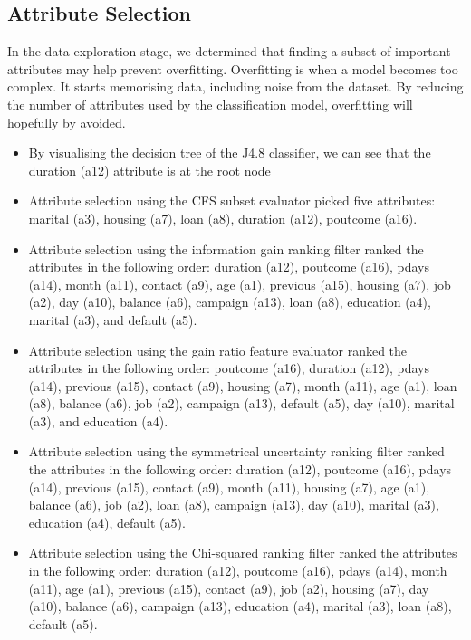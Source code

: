 \documentclass[a4paper,11pt]{article}
\begin{document}
\subsection{Attribute Selection}

In the data exploration stage, we determined that finding a subset of important attributes may help prevent overfitting.
Overfitting is when a model becomes too complex. It starts memorising data, including noise from the dataset. By reducing
the number of attributes used by the classification model, overfitting will hopefully by avoided.

\begin{itemize}
  \item{By visualising the decision tree of the J4.8 classifier, we can see that the duration (a12) attribute is at the
  root node}
  \item{Attribute selection using the CFS subset evaluator picked five attributes: marital (a3), housing (a7), loan (a8),
  duration (a12), poutcome (a16).}
  \item{Attribute selection using the information gain ranking filter ranked the attributes in the following order:
  duration (a12), poutcome (a16), pdays (a14), month (a11), contact (a9), age (a1), previous (a15), housing (a7),
  job (a2), day (a10), balance (a6), campaign (a13), loan (a8), education (a4), marital (a3), and default (a5).}
  \item{Attribute selection using the gain ratio feature evaluator ranked the attributes in the following order:
  poutcome (a16), duration (a12), pdays (a14), previous (a15), contact (a9), housing (a7), month (a11), age (a1),
  loan (a8), balance (a6), job (a2), campaign (a13), default (a5), day (a10), marital (a3), and education (a4).}
  \item{Attribute selection using the symmetrical uncertainty ranking filter ranked the attributes in the following order:
  duration (a12), poutcome (a16), pdays (a14), previous (a15), contact (a9), month (a11), housing (a7), age (a1), 
  balance (a6), job (a2), loan (a8), campaign (a13), day (a10), marital (a3), education (a4), default (a5).}
  \item{Attribute selection using the Chi-squared ranking filter ranked the attributes in the following order:
  duration (a12), poutcome (a16), pdays (a14), month (a11), age (a1), previous (a15), contact (a9), job (a2),
  housing (a7), day (a10), balance (a6), campaign (a13), education (a4), marital (a3), loan (a8), default (a5).}
\end{itemize}
\end{document}
